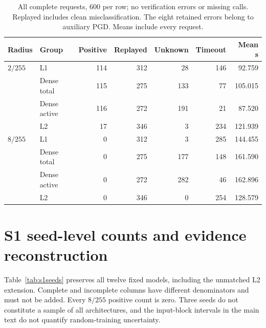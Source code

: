 \begin{table}[ht]
\centering\small
\begin{tabular}{llrrrrr}
\toprule
Radius & Group & Positive & Replayed & Unknown & Timeout & Mean s\\
\midrule
$2/255$ & L1 &114&312&28&146&92.759\\
 & Dense total &115&275&133&77&105.015\\
 & Dense active &116&272&191&21&87.520\\
 & L2 &17&346&3&234&121.939\\
$8/255$ & L1 &0&312&3&285&144.455\\
 & Dense total &0&275&177&148&161.590\\
 & Dense active &0&272&282&46&162.896\\
 & L2 &0&346&0&254&128.579\\
\bottomrule
\end{tabular}
\caption{All complete requests, 600 per row; no verification errors or missing
calls. Replayed includes clean misclassification. The eight retained errors
belong to auxiliary PGD. Means include every request.}
\label{tab:s1states}
\end{table}
\section{S1 seed-level counts and evidence reconstruction}
\label{app:s1seeds}
Table~\ref{tab:s1seeds} preserves all twelve fixed models, including the unmatched
L2 extension. Complete and incomplete columns have different denominators and
must not be added. Every $8/255$ positive count is zero. Three seeds do not
constitute a sample of all architectures, and the input-block intervals in the
main text do not quantify random-training uncertainty.

